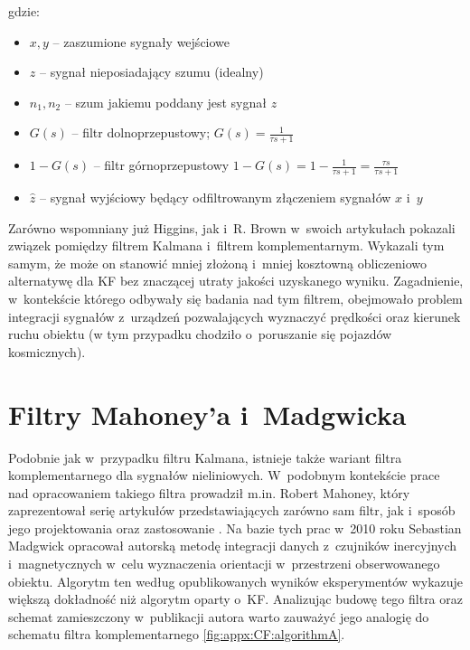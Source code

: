 gdzie:
\begin{itemize}
	\item $x, y$ -- zaszumione sygnały wejściowe
	\item $z$ -- sygnał nieposiadający szumu (idealny)
	\item $n_1, n_2$ -- szum jakiemu poddany jest sygnał $z$
	\item $G(s)$ -- filtr dolnoprzepustowy; $G(s) = \frac{1}{{\tau}s+1}$
	\item $1 - G(s)$ -- filtr górnoprzepustowy $1 - G(s) = 1 - \frac{1}{{\tau}s+1} = \frac{{\tau}s}{{\tau}s+1}$
	\item $\widehat{z}$ -- sygnał wyjściowy będący odfiltrowanym złączeniem sygnałów $x$ i~$y$
\end{itemize}

Zarówno wspomniany już Higgins, jak i~R. Brown \cite{BROWN1972} w~swoich artykułach pokazali związek pomiędzy filtrem Kalmana i~filtrem komplementarnym. Wykazali tym samym, że może on stanowić mniej złożoną i~mniej kosztowną obliczeniowo alternatywę dla KF bez znaczącej utraty jakości uzyskanego wyniku. Zagadnienie, w~kontekście którego odbywały się badania nad tym filtrem, obejmowało problem integracji sygnałów z~urządzeń pozwalających wyznaczyć prędkości oraz kierunek ruchu obiektu (w tym przypadku chodziło o~poruszanie się pojazdów kosmicznych).
\section*{Filtry Mahoney'a i~Madgwicka}
Podobnie jak w~przypadku filtru Kalmana, istnieje także wariant filtra komplementarnego dla sygnałów nieliniowych. W~podobnym kontekście prace nad opracowaniem takiego filtra prowadził m.in. Robert Mahoney, który zaprezentował serię artykułów przedstawiających zarówno sam filtr, jak i~sposób jego projektowania oraz zastosowanie \cite{Baldwin2007,Mahony2005a,Mahony2008,Euston2008}. 
Na bazie tych prac w~2010 roku Sebastian Madgwick opracował autorską metodę \cite{Madgwick2010,Madgwick2011} integracji danych z~czujników inercyjnych i~magnetycznych w~celu wyznaczenia orientacji w~przestrzeni obserwowanego obiektu. Algorytm ten według opublikowanych wyników eksperymentów wykazuje większą dokładność niż algorytm oparty o~KF. Analizując budowę tego filtra oraz schemat zamieszczony w~publikacji autora warto zauważyć jego analogię do schematu filtra komplementarnego \ref{fig:appx:CF:algorithmA}.

